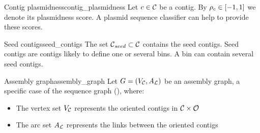 \begin{definition}{Contig plasmidness}{contig_plasmidness}
  Let \(c \in \mathcal{C}{}\) be a contig.
  By \(\rho_{c} \in [-1, 1]\) we denote its plasmidness score.
  A plasmid sequence classifier can help to provide these scores.
\end{definition}

\begin{definition}{Seed contigs}{seed_contigs}
  The set \(\mathcal{C}{}_{seed}{} \subset \mathcal{C}{}\) contains the seed contigs.
  Seed contigs are contigs likely to define one or several bins.
  A bin can contain several seed contigs.
\end{definition}

\begin{definition}{Assembly graph}{assembly_graph}
  Let \(G = (V_{\mathcal{C}{}}, A_{\mathcal{L}{}})\) be an assembly graph, a specific case of the sequence graph (), where:
  \begin{itemize}
    \item The vertex set \(V_{\mathcal{C}{}}\) represents the oriented contigs in \(\mathcal{C}{} \times \mathcal{O}{}\)
    \item The arc set \(A_{\mathcal{L}{}}\) represents the links between the oriented contigs
  \end{itemize}

\end{definition}